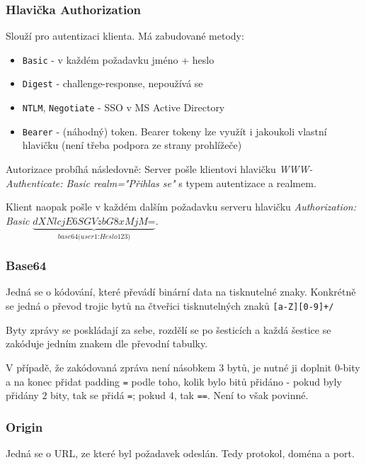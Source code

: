 \documentclass[10pt,a4paper]{article}
\begin{document}
\subsubsection*{Hlavička Authorization}
Slouží pro autentizaci klienta. Má zabudované metody:
\begin{itemize}\setlength\itemsep{0em}
    \item \texttt{Basic} - v každém požadavku jméno + heslo
    \item \texttt{Digest} - challenge-response, nepoužívá se
    \item \texttt{NTLM}, \texttt{Negotiate} - SSO v MS Active Directory
    \item \texttt{Bearer} - (náhodný) token. Bearer tokeny lze využít i jakoukoli vlastní hlavičku (není třeba podpora ze strany prohlížeče)
\end{itemize}

Autorizace probíhá následovně:
Server pošle klientovi hlavičku \textit{WWW-Authenticate: Basic realm="Přihlas se"} s typem autentizace a realmem.

Klient naopak pošle v každém dalším požadavku serveru hlavičku \textit{Authorization: Basic} $\underbrace{\textit{dXNlcjE6SGVzbG8xMjM=}}_{\textit{base64(user1:Heslo123)}}$.

\subsubsection*{Base64}
Jedná se o kódování, které převádí binární data na tisknutelné znaky.
Konkrétně se jedná o převod trojic bytů na čtveřici tisknutelných znaků \texttt{[a-Z][0-9]+/}

Byty zprávy se poskládají za sebe, rozdělí se po šesticích a každá šestice se zakóduje jedním znakem dle převodní tabulky.

V případě, že zakódovaná zpráva není násobkem $3$ bytů, je nutné ji doplnit $0$-bity a na konec přidat padding \texttt{=} podle toho, kolik bylo bitů přidáno - pokud byly přidány $2$ bity, tak se přidá \texttt{=}; pokud $4$, tak \texttt{==}. Není to však povinné.

\subsubsection*{Origin}
Jedná se o URL, ze které byl požadavek odeslán. Tedy protokol, doména a port.
\end{document}
